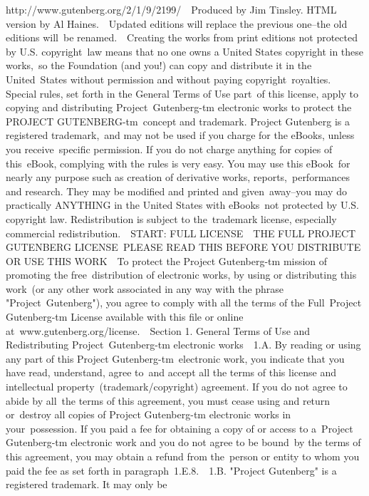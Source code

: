 {        http://www.gutenberg.org/2/1/9/2199/\
\
Produced by Jim Tinsley.  HTML version by Al Haines.\
\
Updated editions will replace the previous one--the old editions will\
be renamed.\
\
Creating the works from print editions not protected by U.S. copyright\
law means that no one owns a United States copyright in these works,\
so the Foundation (and you!) can copy and distribute it in the United\
States without permission and without paying copyright\
royalties. Special rules, set forth in the General Terms of Use part\
of this license, apply to copying and distributing Project\
Gutenberg-tm electronic works to protect the PROJECT GUTENBERG-tm\
concept and trademark. Project Gutenberg is a registered trademark,\
and may not be used if you charge for the eBooks, unless you receive\
specific permission. If you do not charge anything for copies of this\
eBook, complying with the rules is very easy. You may use this eBook\
for nearly any purpose such as creation of derivative works, reports,\
performances and research. They may be modified and printed and given\
away--you may do practically ANYTHING in the United States with eBooks\
not protected by U.S. copyright law. Redistribution is subject to the\
trademark license, especially commercial redistribution.\
\
START: FULL LICENSE\
\
THE FULL PROJECT GUTENBERG LICENSE\
PLEASE READ THIS BEFORE YOU DISTRIBUTE OR USE THIS WORK\
\
To protect the Project Gutenberg-tm mission of promoting the free\
distribution of electronic works, by using or distributing this work\
(or any other work associated in any way with the phrase "Project\
Gutenberg"), you agree to comply with all the terms of the Full\
Project Gutenberg-tm License available with this file or online at\
www.gutenberg.org/license.\
\
Section 1. General Terms of Use and Redistributing Project\
Gutenberg-tm electronic works\
\
1.A. By reading or using any part of this Project Gutenberg-tm\
electronic work, you indicate that you have read, understand, agree to\
and accept all the terms of this license and intellectual property\
(trademark/copyright) agreement. If you do not agree to abide by all\
the terms of this agreement, you must cease using and return or\
destroy all copies of Project Gutenberg-tm electronic works in your\
possession. If you paid a fee for obtaining a copy of or access to a\
Project Gutenberg-tm electronic work and you do not agree to be bound\
by the terms of this agreement, you may obtain a refund from the\
person or entity to whom you paid the fee as set forth in paragraph\
1.E.8.\
\
1.B. "Project Gutenberg" is a registered trademark. It may only be\
}

